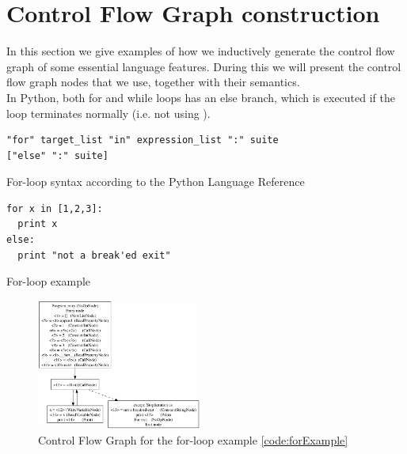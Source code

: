 \chapter{Control Flow Graph construction}

In this section we give examples of how we inductively generate the control flow graph of some essential language features. During this we will present the control flow graph nodes that we use, together with their semantics. \\
In Python, both for and while loops has an else branch, which is executed if the loop terminates normally (i.e. not using ).

\begin{listing}[H]
	\begin{verbatim}
"for" target_list "in" expression_list ":" suite 
["else" ":" suite]
	\end{verbatim}
	\caption{For-loop syntax according to the Python Language Reference}\label{code:forSyntax}
\end{listing}

\begin{listing}[H]
	\begin{verbatim}
for x in [1,2,3]:
  print x
else:
  print "not a break'ed exit"
	\end{verbatim}
	\caption{For-loop example}\label{code:forExample}
\end{listing}

\begin{figure}
	\vspace{-20pt}
	\begin{center}
		\includegraphics[width=0.48\textwidth]{images/for-example-cfg.png}
	\end{center}
	\vspace{-10pt}
	\caption{Control Flow Graph for the for-loop example \ref{code:forExample}}
	\label{fig:forCfg}
	\vspace{-10pt}
\end{figure}

